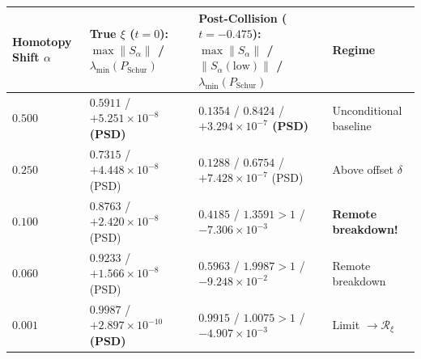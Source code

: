 \documentclass[
  11pt,
]{article}
\newcounter{none} %
\begin{document}
\begin{enumerate}
  {\def\LTcaptype{none} %
  \begin{longtable}[]{@{}
    >{\centering\arraybackslash}p{}
    >{\centering\arraybackslash}p{}
    >{\centering\arraybackslash}p{}
    >{\raggedright\arraybackslash}p{}@{}}
  \toprule\noalign{}
  \begin{minipage}[b]{\linewidth}\centering
  Homotopy Shift \(\alpha\)
  \end{minipage} & \begin{minipage}[b]{\linewidth}\centering
  True \(\xi\) (\(t=0\)): \(\max\|S_\alpha\|\) /
  \(\lambda_{\min}(P_{\text{Schur}})\)
  \end{minipage} & \begin{minipage}[b]{\linewidth}\centering
  Post-Collision (\(t=-0.475\)): \(\max\|S_\alpha\|\) /
  \(\|S_\alpha(\text{low})\|\) / \(\lambda_{\min}(P_{\text{Schur}})\)
  \end{minipage} & \begin{minipage}[b]{\linewidth}\raggedright
  Regime
  \end{minipage} \\
  \midrule\noalign{}
  \endhead
  \bottomrule\noalign{}
  \endlastfoot
  \textbf{\(0.500\)} & \(0.5911\) / \textbf{\(+5.251 \times 10^{-8}\)
  (PSD)} & \(0.1354\) / \(0.8424\) / \textbf{\(+3.294 \times 10^{-7}\)
  (PSD)} & Unconditional baseline \\
  \(0.250\) & \(0.7315\) / \(+4.448 \times 10^{-8}\) (PSD) & \(0.1288\)
  / \(0.6754\) / \(+7.428 \times 10^{-7}\) (PSD) & Above offset
  \(\delta\) \\
  \textbf{\(0.100\)} & \(0.8763\) / \(+2.420 \times 10^{-8}\) (PSD) &
  \(0.4185\) / \textbf{\(1.3591 > 1\)} /
  \textbf{\(-7.306 \times 10^{-3}\)} & \textbf{Remote breakdown!} \\
  \(0.060\) & \(0.9233\) / \(+1.566 \times 10^{-8}\) (PSD) & \(0.5963\)
  / \(1.9987 > 1\) / \textbf{\(-9.248 \times 10^{-2}\)} & Remote
  breakdown \\
  \(0.001\) & \(0.9987\) / \textbf{\(+2.897 \times 10^{-10}\) (PSD)} &
  \(0.9915\) / \(1.0075 > 1\) / \textbf{\(-4.907 \times 10^{-3}\)} &
  Limit \(\to \mathcal{R}_\xi\) \\
  \end{longtable}
  }


\end{enumerate}
\end{document}
